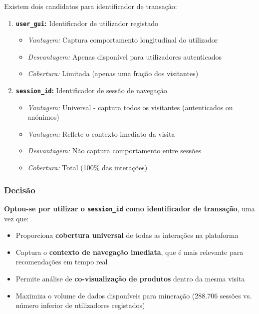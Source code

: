 \documentclass[11pt,a4paper]{article}
\begin{document}
Existem dois candidatos para identificador de transação:

\begin{enumerate}
    \item \textbf{\texttt{user\_gui}:} Identificador de utilizador registado
    \begin{itemize}
        \item \textit{Vantagem:} Captura comportamento longitudinal do utilizador
        \item \textit{Desvantagem:} Apenas disponível para utilizadores autenticados
        \item \textit{Cobertura:} Limitada (apenas uma fração dos visitantes)
    \end{itemize}
    
    \item \textbf{\texttt{session\_id}:} Identificador de sessão de navegação
    \begin{itemize}
        \item \textit{Vantagem:} Universal - captura todos os visitantes (autenticados ou anónimos)
        \item \textit{Vantagem:} Reflete o contexto imediato da visita
        \item \textit{Desvantagem:} Não captura comportamento entre sessões
        \item \textit{Cobertura:} Total (100\% das interações)
    \end{itemize}
\end{enumerate}

\subsubsection{Decisão}

\textbf{Optou-se por utilizar o \texttt{session\_id} como identificador de transação}, uma vez que:

\begin{itemize}
    \item Proporciona \textbf{cobertura universal} de todas as interações na plataforma
    \item Captura o \textbf{contexto de navegação imediata}, que é mais relevante para recomendações em tempo real
    \item Permite análise de \textbf{co-visualização de produtos} dentro da mesma visita
    \item Maximiza o volume de dados disponíveis para mineração (288.706 sessões vs. número inferior de utilizadores registados)
\end{itemize}
\end{document}
